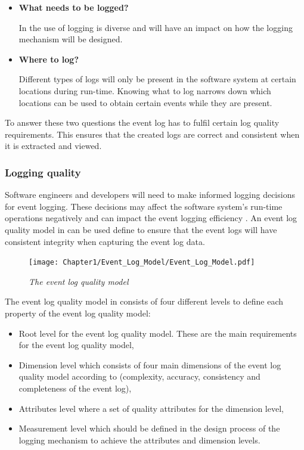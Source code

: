 \begin{itemize}
	\item \textbf{What needs to be logged?}\par In  the use of logging is diverse and will have an impact on how the logging mechanism will be designed.
	\item \textbf{Where to log?} \par Different types of logs will only be present in the software system at certain locations during run-time. Knowing what to log narrows down which locations can be used to obtain certain events while they are present.
\end{itemize}

To answer these two questions the event log has to fulfil certain log quality requirements. This ensures that the created logs are correct and consistent when it is extracted and viewed. 

\clearpage

\subsubsection{Logging quality}\label{sec:ch1_loggingQuality}

Software engineers and developers will need to make informed logging decisions for event logging. These decisions may affect the software system's run-time operations negatively and can impact the event logging efficiency \cite{Zhu2015, Zhu2019, Kherbouche2017}. An event log quality model in  can be used define to ensure that the event logs will have consistent integrity when capturing the event log data.

\begin{figure}[!htb]
	\centering %
	\texttt{[image: Chapter1/Event\_Log\_Model/Event\_Log\_Model.pdf]}
	\caption[The event log quality model]
	{\textit{The event log quality model \cite{Kherbouche2017}}} \label{fig:ch1_EventQModel}
\end{figure}

The event log quality model in  consists of four different levels to define each property of the event log quality model:

\begin{itemize}
	\item Root level for the event log quality model. These are the main requirements for the event log quality model,
	\item Dimension level which consists of four main dimensions of the event log quality model according to \cite{Kherbouche2017} (complexity, accuracy, consistency and completeness of the event log),
	\item Attributes level where a set of quality attributes for the dimension level,
	\item Measurement level which should be defined in the design process of the logging mechanism to achieve the attributes and dimension levels.
\end{itemize}

